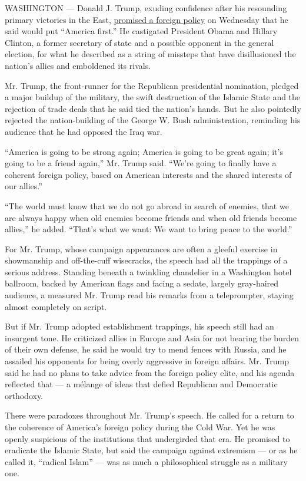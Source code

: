 WASHINGTON --- Donald J. Trump, exuding confidence after his resounding
primary victories in the East,
\href{http://www.nytimes3xbfgragh.onion/2016/04/28/us/politics/transcript-trump-foreign-policy.html}{promised
a foreign policy} on Wednesday that he said would put ``America first.''
He castigated President Obama and Hillary Clinton, a former secretary of
state and a possible opponent in the general election, for what he
described as a string of missteps that have disillusioned the nation's
allies and emboldened its rivals.

Mr. Trump, the front-runner for the Republican presidential nomination,
pledged a major buildup of the military, the swift destruction of the
Islamic State and the rejection of trade deals that he said tied the
nation's hands. But he also pointedly rejected the nation-building of
the George W. Bush administration, reminding his audience that he had
opposed the Iraq war.

``America is going to be strong again; America is going to be great
again; it's going to be a friend again,'' Mr. Trump said. ``We're going
to finally have a coherent foreign policy, based on American interests
and the shared interests of our allies.''

``The world must know that we do not go abroad in search of enemies,
that we are always happy when old enemies become friends and when old
friends become allies,'' he added. ``That's what we want: We want to
bring peace to the world.''

For Mr. Trump, whose campaign appearances are often a gleeful exercise
in showmanship and off-the-cuff wisecracks, the speech had all the
trappings of a serious address. Standing beneath a twinkling chandelier
in a Washington hotel ballroom, backed by American flags and facing a
sedate, largely gray-haired audience, a measured Mr. Trump read his
remarks from a teleprompter, staying almost completely on script.

But if Mr. Trump adopted establishment trappings, his speech still had
an insurgent tone. He criticized allies in Europe and Asia for not
bearing the burden of their own defense, he said he would try to mend
fences with Russia, and he assailed his opponents for being overly
aggressive in foreign affairs. Mr. Trump said he had no plans to take
advice from the foreign policy elite, and his agenda reflected that ---
a mélange of ideas that defied Republican and Democratic orthodoxy.

There were paradoxes throughout Mr. Trump's speech. He called for a
return to the coherence of America's foreign policy during the Cold War.
Yet he was openly suspicious of the institutions that undergirded that
era. He promised to eradicate the Islamic State, but said the campaign
against extremism --- or as he called it, ``radical Islam'' --- was as
much a philosophical struggle as a military one.

